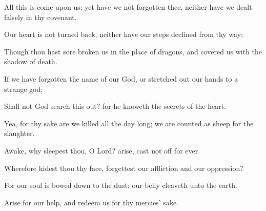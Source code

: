 {\Q {}All this is
come upon us; yet have we not
forgotten thee, neither have we dealt
falsely in thy
covenant.


\par }{\Q {}Our
heart is not
turned
back, neither have our
steps
declined from thy
way;


\par }{\Q {}Though thou hast sore
broken us in the
place of
dragons, and
covered us with the shadow of
death.


\par }{\Q {}If we have
forgotten the
name of our
God, or stretched
out our
hands to a
strange
god;


\par }{\Q {}Shall not
God search this
out? for he
knoweth the
secrets of the
heart.


\par }{\Q {}Yea, for thy sake are we
killed all the
day long; we are
counted as
sheep for the
slaughter.


\par }{\Q {}Awake, why
sleepest thou, O
Lord?
arise, cast
{} not
off for
ever.


\par }{\Q {}Wherefore
hidest thou thy
face,
{}
forgettest our
affliction and our
oppression?


\par }{\Q {}For our
soul is bowed
down to the
dust: our
belly
cleaveth unto the
earth.


\par }{\Q {}Arise for our
help, and
redeem us for thy
mercies’ sake.




\par }
